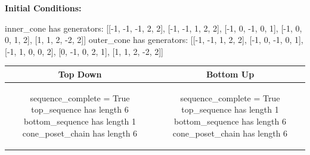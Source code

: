 \documentclass[10pt]{article}
\begin{document}
\textbf{Initial Conditions:}
\begin{SAGE}
inner_cone has generators: 
[[-1, -1, -1, 2, 2], [-1, -1, 1, 2, 2], [-1, 0, -1, 0, 1], [-1, 0, 0, 1, 2], [1, 1, 2, -2, 2]]
outer_cone has generators: 
[[-1, -1, 1, 2, 2], [-1, 0, -1, 0, 1], [-1, 1, 0, 0, 2], [0, -1, 0, 2, 1], [1, 1, 2, -2, 2]]

\end{SAGE}
\begin{tabular}{c|c}
\textbf{Top Down} & \textbf{Bottom Up} \\ \hline  
\begin{SAGE}
sequence_complete = True
top_sequence has length 6
bottom_sequence has length 1
cone_poset_chain has length 6
\end{SAGE} 
&
\begin{SAGE}
sequence_complete = True
top_sequence has length 1
bottom_sequence has length 6
cone_poset_chain has length 6
\end{SAGE} 
\\ \hline


\end{tabular}
\end{document}
